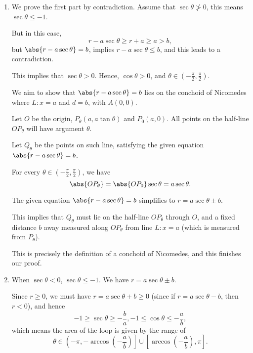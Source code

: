 \Question{\currfilebase}

\begin{enumerate}
    \item We prove the first part by contradiction. Assume that \(\sec\theta \ngtr 0\), this means \(\sec \theta \leq -1\).

          But in this case,
          \[
              r - a \sec \theta \geq r + a \geq a > b,
          \]
          but \(\abs{r - a \sec \theta} = b\), implies \(r - a \sec \theta \leq b\), and this leads to a contradiction.

          This implies that \(\sec \theta > 0\). Hence, \(\cos \theta > 0\), and \(\theta \in \left(-\frac{\pi}{2}, \frac{\pi}{2}\right)\).

          We aim to show that \(\abs{r - a \sec \theta} = b\) lies on the conchoid of Nicomedes where \(L: x = a\) and \(d = b\), with \(A(0, 0)\).

          Let \(O\) be the origin, \(P_{\theta}(a, a \tan \theta)\) and \(P_0(a, 0)\). All points on the half-line \(OP_{\theta}\) will have argument \(\theta\).

          Let \(Q_{\theta}\) be the points on such line, satisfying the given equation \(\abs{r - a \sec \theta} = b\).

          For every \(\theta \in \left(-\frac{\pi}{2}, \frac{\pi}{2}\right)\), we have
          \[
              \abs{OP_{\theta}} = \abs{OP_0} \sec \theta = a \sec \theta.
          \]

          The given equation \(\abs{r - a \sec \theta} = b\) simplifies to \(r = a \sec \theta \pm b\).

          This implies that \(Q_{\theta}\) must lie on the half-line \(OP_{\theta}\) through \(O\), and a fixed distance \(b\) away measured along \(OP_{\theta}\) from line \(L: x = a\) (which is measured from \(P_{\theta}\)).

          This is precisely the definition of a conchoid of Nicomedes, and this finishes our proof.

    \item When \(\sec \theta < 0\), \(\sec\theta \leq -1\). We have \(r = a \sec \theta \pm b\).

          Since \(r \geq 0\), we must have \(r = a \sec \theta + b \geq 0\) (since if \(r = a \sec \theta - b\), then \(r < 0\)), and hence
          \[
              -1 \geq \sec\theta  \geq -\frac{b}{a}, -1 \leq \cos\theta \leq -\frac{a}{b},
          \]
          which means the area of the loop is given by the range of
          \[
              \theta \in \left(-\pi, -\arccos\left(-\frac{a}{b}\right)\right] \cup \left[\arccos\left(-\frac{a}{b}\right), \pi\right].
          \]


\end{enumerate}
